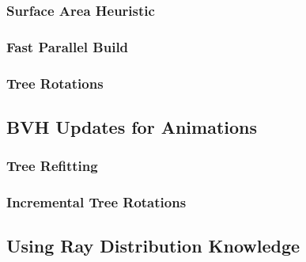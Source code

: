 \documentclass{article}
\begin{document}
\subsubsection{Surface Area Heuristic}
\subsubsection{Fast Parallel Build}
\subsubsection{Tree Rotations}
\subsection{BVH Updates for Animations}
\subsubsection{Tree Refitting}
\subsubsection{Incremental Tree Rotations}
\subsection{Using Ray Distribution Knowledge}

\end{document}
